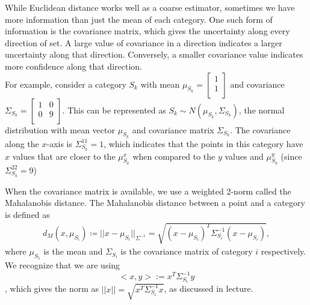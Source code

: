 \documentclass[letterpaper]{article}
\begin{document}
\begin{enumerate}
While Euclidean distance works well as a coarse estimator, sometimes we have more information than just the mean of each category. One such form of information is the covariance matrix, which gives the uncertainty along every direction of set. A large value of covariance in a direction indicates a larger uncertainty along that direction. Conversely, a smaller covariance value indicates more confidence along that direction. \\ For example, consider a category $S_k$ with mean $\mu_{S_k} = \begin{bmatrix} 1 \\ 1 \\
\end{bmatrix} $ and covariance $\Sigma_{S_k} = \begin{bmatrix} 1 & 0 \\ 0 & 9 \\
\end{bmatrix}$. This can be represented as $S_{k} \sim N\left(\mu_{S_k}, \Sigma_{S_k}\right)$, the normal distribution with mean vector $\mu_{S_k}$ and covariance matrix $\Sigma_{S_k}$.
The covariance along the $x$-axis is $\Sigma_{S_k}^{11} = 1$, which indicates that the points in this category have $x$ values that are closer to the $\mu_{S_k}^x$ when compared to the $y$ values and  $\mu_{S_k}^y$ (since $\Sigma_{S_k}^{22} = 9$)

When the covariance matrix is available, we use a weighted 2-norm called the Mahalanobis distance. The Mahalanobis distance between a point and a category is defined as
\begin{align}
d_{M}(x, \mu_{S_i}) \coloneqq \vert\vert x - \mu_{S_i} \vert\vert_{\Sigma^{-1}} = \sqrt{(x-\mu_{S_i})^T\Sigma_{S_i}^{-1}(x-\mu_{S_i}) },
\nonumber
\end{align}
where $\mu_{S_1}$ is the mean and $\Sigma_{S_i}$ is the covariance matrix of category $i$ respectively. We recognize that we are using
$$<x,y>:= x^T\Sigma_{S_i}^{-1}y$$,
which gives the norm as $||x||=\sqrt{x^T\Sigma_{S_i}^{-1}x}$, as discussed in lecture.\\


\end{enumerate}
\end{document}
